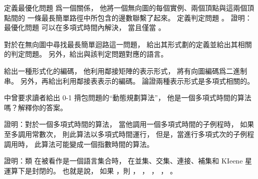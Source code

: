 \startsection[
  title={Polynomial time},
]

\startEXERCISE
定義最優化問題  爲一個關係，
他將一個無向圖的每個實例、兩個頂點與這兩個頂點間的
一條最長簡單路徑中所包含的邊數聯繫了起來。
定義判定問題 。
證明：最優化問題  可以在多項式時間內解決，
當且僅當 。
\stopEXERCISE

\startANSWER
{}
\stopANSWER

\startEXERCISE
對於在無向圖中尋找最長簡單迴路這一問題，
給出其形式劃的定義並給出其相關的判定問題。
另外，給出與該判定問題對應的語言。
\stopEXERCISE

\startANSWER
{}
\stopANSWER

\startEXERCISE
給出一種形式化的編碼，
他利用鄰接矩陣的表示形式，
將有向圖編碼爲二進制串。
另外，再給出利用鄰接表表示的編碼。
論證兩種表示形式是多項式相關的。
\stopEXERCISE

\startANSWER
{}
\stopANSWER

\startEXERCISE
{} 中曾要求讀者給出 0-1 揹包問題的“動態規劃算法”，
他是一個多項式時間的算法嗎？解釋你的答案。
\stopEXERCISE

\startANSWER
{}
\stopANSWER

\startEXERCISE
證明：對於一個多項式時間的算法，
當他調用一個多項式時間的子例程時，
如果至多調用常數次，
則此算法以多項式時間運行，
但是，當進行多項式次的子例程調用時，
此算法可能變成一個指數時間的算法。
\stopEXERCISE

\startANSWER
{}
\stopANSWER

\startEXERCISE
證明：類  在被看作是一個語言集合時，
在並集、交集、連接、補集和 KIeene 星運算下是封閉的。
也就是說，
如果 ，則 ，
 ， ， ， 。
\stopEXERCISE

\startANSWER
{}
\stopANSWER

\stopsection

